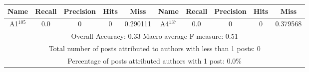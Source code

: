 \begin{tabular}{|c|c|c|c|c||c|c|c|c|c|}
\hline 
Name & Recall & Precision & Hits & Miss &Name & Recall & Precision & Hits & Miss \\ 
\hline 
A1$^{105}$ & 0.0 & 0 & 0 & 0.290111 & A4$^{137}$ & 0.0 & 0 & 0 & 0.379568 \\ 
\hline 
\multicolumn{10}{|c|}{Overall Accuracy: 0.33 Macro-average F-measure: 0.51}\\ 
\multicolumn{10}{|c|}{Total number of posts attributed to authors with less than 1 posts: 0}\\ 
\multicolumn{10}{|c|}{Percentage of posts attributed authors with 1 post: 0.0\%}\\ 
\hline 
\end{tabular}